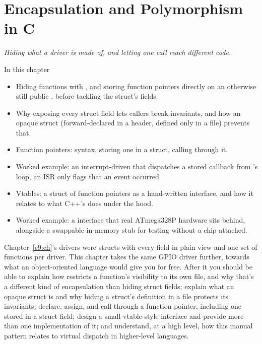 
\chapter{Encapsulation and Polymorphism in C}
\label{c10:ch}

{\large\itshape Hiding what a driver is made of, and letting one call reach different code.\par}

\begin{chapterbox}{In this chapter}
\begin{itemize}
  \item Hiding functions with , and storing function pointers directly on an
    otherwise still public , before tackling the struct's fields.
  \item Why exposing every struct field lets callers break invariants, and how an opaque struct
    (forward-declared in a header, defined only in a  file) prevents that.
  \item Function pointers: syntax, storing one in a struct, calling through it.
  \item Worked example: an interrupt-driven  that dispatches a stored callback from
    's loop, an ISR only flags that an event occurred.
  \item Vtables: a struct of function pointers as a hand-written interface, and how it relates to
    what C++'s  does under the hood.
  \item Worked example: a  interface that real ATmega328P hardware sits
    behind, alongside a swappable in-memory stub for testing without a chip attached.
\end{itemize}
\end{chapterbox}

Chapter~\ref{c9:ch}'s drivers were structs with every field in plain view and one set of functions
per driver. This chapter takes the same GPIO driver further, towards what an object-oriented
language would give you for free. After it you should be able to explain how 
restricts a function's visibility to its own file, and why that's a different kind of
encapsulation than hiding struct fields; explain what an opaque struct is and why hiding a struct's
definition in a  file protects its invariants; declare, assign, and call through a
function pointer, including one stored in a struct field; design a small vtable-style interface
and provide more than one implementation of it; and understand, at a high level, how this manual
pattern relates to virtual dispatch in higher-level languages.

